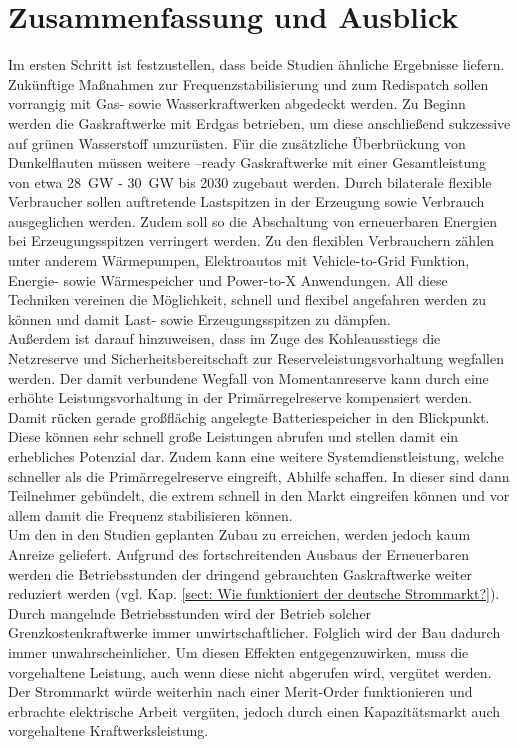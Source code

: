 \section{Zusammenfassung und Ausblick}

	Im ersten Schritt ist festzustellen, dass beide Studien ähnliche Ergebnisse liefern.
	Zukünftige Maßnahmen zur Frequenzstabilisierung und zum Redispatch sollen vorrangig mit Gas- sowie Wasserkraftwerken abgedeckt werden.
	Zu Beginn werden die Gaskraftwerke mit Erdgas betrieben, um diese anschließend sukzessive auf grünen Wasserstoff umzurüsten.
	Für die zusätzliche Überbrückung von Dunkelflauten müssen weitere \Htwo--ready Gaskraftwerke mit einer Gesamtleistung von etwa \SI{28}{\giga\watt} - \SI{30}{\giga\watt} bis 2030 zugebaut werden.
	Durch bilaterale flexible Verbraucher sollen auftretende Lastspitzen in der Erzeugung sowie Verbrauch ausgeglichen werden.
	Zudem soll so die Abschaltung von erneuerbaren Energien bei Erzeugungsspitzen verringert werden.
	Zu den flexiblen Verbrauchern zählen unter anderem Wärmepumpen, Elektroautos mit Vehicle-to-Grid Funktion, Energie- sowie Wärmespeicher und Power-to-X Anwendungen.
	All diese Techniken vereinen die Möglichkeit, schnell und flexibel angefahren werden zu können und damit Last- sowie Erzeugungsspitzen zu dämpfen. \\
	
	Außerdem ist darauf hinzuweisen, dass im Zuge des Kohleausstiegs die Netzreserve und Sicherheitsbereitschaft zur Reserveleistungsvorhaltung wegfallen werden.
	Der damit verbundene Wegfall von Momentanreserve kann durch eine erhöhte Leistungsvorhaltung in der Primärregelreserve kompensiert werden.
	Damit rücken gerade großflächig angelegte Batteriespeicher in den Blickpunkt.
	Diese können sehr schnell große Leistungen abrufen und stellen damit ein erhebliches Potenzial dar. 
	Zudem kann eine weitere Systemdienstleistung, welche schneller als die Primärregelreserve eingreift, Abhilfe  schaffen.
	In dieser sind dann Teilnehmer gebündelt, die extrem schnell in den Markt eingreifen können und vor allem damit die Frequenz stabilisieren können. \\
	
	Um den in den Studien geplanten Zubau zu erreichen, werden jedoch kaum Anreize geliefert.
	Aufgrund des fortschreitenden Ausbaus der Erneuerbaren werden die Betriebsstunden der dringend gebrauchten Gaskraftwerke weiter reduziert werden (vgl. Kap. \ref{sect: Wie funktioniert der deutsche Strommarkt?}).
	Durch mangelnde Betriebsstunden wird der Betrieb solcher Grenzkostenkraftwerke immer unwirtschaftlicher.
	Folglich wird der Bau dadurch immer unwahrscheinlicher.
	Um diesen Effekten entgegenzuwirken, muss die vorgehaltene Leistung, auch wenn diese nicht abgerufen wird, vergütet werden.
	Der Strommarkt würde weiterhin nach einer Merit-Order funktionieren und erbrachte elektrische Arbeit vergüten, jedoch durch einen Kapazitätsmarkt auch vorgehaltene Kraftwerksleistung. \\
	
